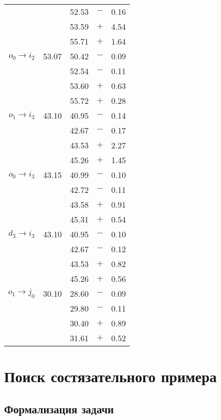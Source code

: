 \documentclass[a4paper]{article}
\newcommand{\sprule}{\rule{0pt}{1.3em}}
\begin{document}
\begin{longtable}{rrrcr}
              &       & 52.53 & $-$ & 0.16 \\
              &       & 53.59 & $+$ & 4.54 \\
              &       & 55.71 & $+$ & 1.64 \\
    \sprule
    $o_0 \to i_2$ & 53.07 & 50.42 & $-$ & 0.09 \\
              &       & 52.54 & $-$ & 0.11 \\
              &       & 53.60 & $+$ & 0.63 \\
              &       & 55.72 & $+$ & 0.28 \\
    \sprule
    $o_1 \to i_3$ & 43.10 & 40.95 & $-$ & 0.14 \\
              &       & 42.67 & $-$ & 0.17 \\
              &       & 43.53 & $+$ & 2.27 \\
              &       & 45.26 & $+$ & 1.45 \\
    \sprule
    $o_0 \to i_3$ & 43.15 & 40.99 & $-$ & 0.10 \\
              &       & 42.72 & $-$ & 0.11 \\
              &       & 43.58 & $+$ & 0.91 \\
              &       & 45.31 & $+$ & 0.54 \\
    \sprule
    $d_3 \to i_3$ & 43.10 & 40.95 & $-$ & 0.10 \\
              &       & 42.67 & $-$ & 0.12 \\
              &       & 43.53 & $+$ & 0.82 \\
              &       & 45.26 & $+$ & 0.56 \\
    \sprule
    $o_1 \to j_0$ & 30.10 & 28.60 & $-$ & 0.09 \\
              &       & 29.80 & $-$ & 0.11 \\
              &       & 30.40 & $+$ & 0.89 \\
              &       & 31.61 & $+$ & 0.52 \\
    \bottomrule
\end{longtable}

\section{Поиск состязательного примера}

\subsection{Формализация задачи}
\end{document}
